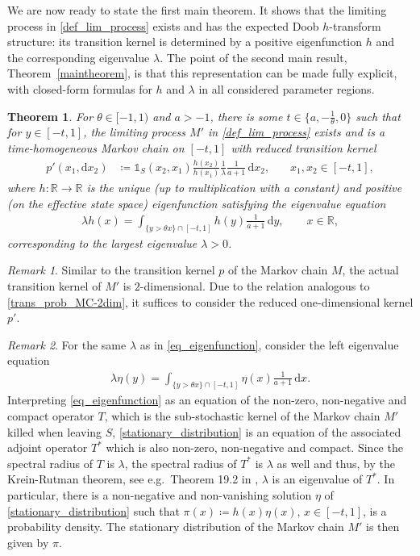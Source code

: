 \documentclass[12pt]{article}
\newcommand{\R}{\mathbb{R}} %
\newcommand{\1}{\mathds{1}}
\renewcommand{\d}{\mathrm{d}}
\theoremstyle{definition}
\theoremstyle{plain}
\newtheorem{Theorem}[definition]{Theorem}
\theoremstyle{remark}
\newtheorem{Remark}{Remark}
\begin{document}
We are now ready to state the first main theorem. It shows that the limiting process in \eqref{def_lim_process} exists and has the expected Doob $h$-transform structure: its transition kernel is determined by a positive eigenfunction $h$ and the corresponding eigenvalue $\lambda$. The point of the second main result, Theorem~\ref{maintheorem}, is that this representation can be made fully explicit, with closed-form formulas for $h$ and $\lambda$ in all considered parameter regions.


\begin{Theorem}\label{maintheorem_2}
    For $\theta\in[-1,1)$ and $a>-1$, there is some $t\in\{a,-\frac{1}{\theta},0\}$ such that for $y\in[-t,1]$, the limiting process $M'$ in \eqref{def_lim_process} exists and is a time-homogeneous Markov chain on $[-t,1]$ with reduced transition kernel 
\begin{align*}
     p'(x_1,\d x_2)&\coloneqq \mathds{1}_S(x_2,x_1)\frac{h(x_2)}{h(x_1)}\frac{1}{\lambda}\frac{1}{a+1}\,\d x_2,~~~~~~~~x_1,x_2\in[-t,1],
\end{align*}
 where $h:\R\to\R$ is the unique (up to multiplication with a constant) and positive (on the effective state space) eigenfunction satisfying the eigenvalue equation
\begin{align}\label{eq_eigenfunction}
    \lambda h(x)=\int_{\{y>\theta x\}\cap[-t,1]} h(y) \frac{1}{a+1}\,\d y,\qquad x\in\R,
\end{align}
corresponding to the largest eigenvalue $\lambda>0$.
\end{Theorem}
\begin{Remark}
  Similar to the transition kernel $p$ of the Markov chain $M$, the actual transition kernel of $M'$ is $2$-dimensional. Due to the relation analogous to \eqref{trans_prob_MC-2dim}, it suffices to consider the reduced one-dimensional kernel $p'$.
\end{Remark}
\begin{Remark}
  For the same $\lambda$ as in \eqref{eq_eigenfunction}, consider the left eigenvalue equation 
  \begin{align}\label{stationary_distribution}
      \lambda\eta(y)=\int_{\{y>\theta x\}\cap[-t,1]}\eta(x)\frac{1}{a+1}\,\d x.
  \end{align} 
  Interpreting \eqref{eq_eigenfunction} as an equation of the non-zero, non-negative and compact operator $T$, which is the sub-stochastic kernel of the Markov chain $M'$ killed when leaving $S$, \eqref{stationary_distribution} is an equation of the associated adjoint operator $T^*$ which is also non-zero, non-negative and compact. Since the spectral radius of $T$ is $\lambda$, the spectral radius of $T^*$ is $\lambda$ as well and thus, by the Krein-Rutman theorem, see e.g.\ Theorem 19.2 in \cite{KreinRutman}, $\lambda$ is an eigenvalue of $T^*$. In particular, there is a non-negative and non-vanishing solution $\eta$ of \eqref{stationary_distribution} such that $\pi(x)\coloneqq h(x)\eta(x)$, $x\in[-t,1]$, is a probability density. The stationary distribution of the Markov chain $M'$ is then given by $\pi$.
\end{Remark}
\end{document}
